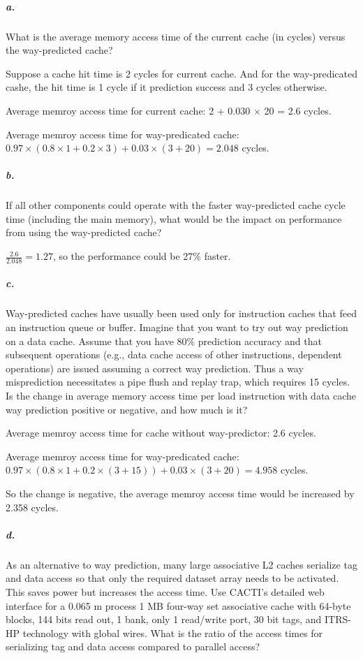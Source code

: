 \documentclass{article}
\begin{document}
\subparagraph{a.} What is the average memory access time of the current cache (in cycles) versus the way-predicted cache?

Suppose a cache hit time is 2 cycles for current cache. And for the way-predicated cashe, the hit time is 1 cycle if it prediction success and 3 cycles otherwise.

Average memroy access time for current cache: 2 + 0.030 $\times$ 20 = 2.6 cycles.

Average memroy access time for way-predicated cache: $0.97\times(0.8\times1+0.2\times3)+0.03\times(3+20)=2.048$ cycles.

\subparagraph{b.} If all other components could operate with the faster way-predicted cache cycle time (including the main memory), what would be the impact on performance from using the way-predicted cache?

$\frac{2.6}{2.048}=1.27$, so the performance could be 27\% faster.

\subparagraph{c.} Way-predicted caches have usually been used only for instruction caches that feed an instruction queue or buffer. Imagine that you want to try out way prediction on a data cache. Assume that you have 80\% prediction accuracy and that subsequent operations (e.g., data cache access of other instructions, dependent operations) are issued assuming a correct way prediction. Thus a way misprediction necessitates a pipe flush and replay trap, which requires 15 cycles. Is the change in average memory access time per load instruction with data cache way prediction positive or negative, and how much is it?

Average memroy access time for cache without way-predictor: 2.6 cycles.

Average memroy access time for way-predicated cache: $0.97\times(0.8\times1+0.2\times(3+15))+0.03\times(3+20)=4.958$ cycles.

So the change is negative, the average memroy access time would be increased by 2.358 cycles.

\subparagraph{d.} As an alternative to way prediction, many large associative L2 caches serialize tag and data access so that only the required dataset array needs to be activated. This saves power but increases the access time. Use CACTI’s detailed web interface for a 0.065 m process 1 MB four-way set associative cache with 64-byte blocks, 144 bits read out, 1 bank, only 1 read/write port, 30 bit tags, and ITRS-HP technology with global wires. What is the ratio of the access times for serializing tag and data access compared to parallel access?
\end{document}
